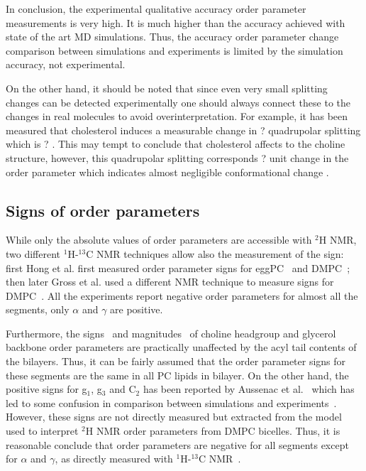 \documentclass[aps,prl,superscriptaddress,twocolumn]{revtex4}
\begin{document}
In conclusion, the experimental qualitative accuracy order parameter measurements is very high.
It is much higher than the accuracy achieved with state of the art MD simulations.
Thus, the accuracy order parameter change comparison between simulations and experiments is
limited by the simulation accuracy, not experimental. 

On the other hand, it should be noted that since even very small splitting changes can 
be detected experimentally one should always connect these to the changes in real molecules
to avoid overinterpretation. For example, it has been measured that cholesterol induces 
a measurable change in ? quadrupolar splitting which is ? \cite{??}. This may tempt to conclude that
cholesterol affects to the choline structure, however, this quadrupolar splitting corresponds
? unit change in the order parameter which indicates almost negligible conformational change \cite{botan15}.


\subsection{Signs of order parameters}

While only the absolute values of order parameters are accessible with $^2$H NMR, two different 
$^1$H-$^{13}$C NMR techniques allow also the measurement of the sign: 
first Hong et al. first measured order parameter signs for eggPC~\cite{hong95a} and DMPC~\cite{hong95b}; 
then later Gross et al. used a different NMR technique to measure signs for DMPC~\cite{gross97}. 
All the experiments report negative order parameters for almost all the segments, only $\alpha$ and $\gamma$ are positive.

Furthermore, the signs~\cite{hong95a,hong95b,gross97}  and magnitudes~\cite{gally81,ferreira13,botan15} of choline headgroup 
and glycerol backbone order parameters are practically unaffected by the acyl tail contents of the bilayers. 
Thus, it can be fairly assumed that the order parameter signs for these segments are the same in all PC lipids in bilayer. 
On the other hand, the positive signs for g$_1$, g$_3$ and C$_2$ has been reported by Aussenac et al.~\cite{aussenac03} 
which has led to some confusion in comparison between simulations and experiments~\cite{hogberg08}. 
However, these signs are not directly measured but extracted from the model used to interpret 
$^2$H NMR order parameters from DMPC bicelles. Thus, it is reasonable conclude that 
order parameters are negative for all segments except for $\alpha$ and $\gamma$, as 
directly measured with $^1$H-$^{13}$C NMR~\cite{hong95a,hong95b,gross97}.
\end{document}
